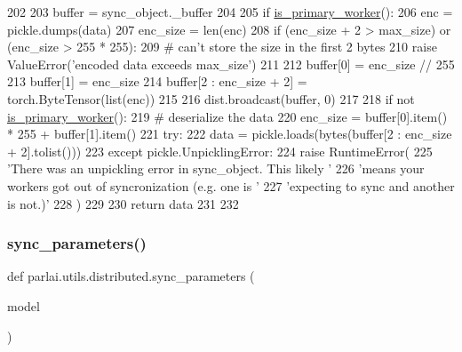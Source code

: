 \begin{DoxyCode}
202 
203     buffer = sync\_object.\_buffer
204 
205     \textcolor{keywordflow}{if} \hyperlink{namespaceparlai_1_1utils_1_1distributed_a9bb1dac198180590ef8c6b6c6f9fc2c4}{is\_primary\_worker}():
206         enc = pickle.dumps(data)
207         enc\_size = len(enc)
208         \textcolor{keywordflow}{if} (enc\_size + 2 > max\_size) \textcolor{keywordflow}{or} (enc\_size > 255 * 255):
209             \textcolor{comment}{# can't store the size in the first 2 bytes}
210             \textcolor{keywordflow}{raise} ValueError(\textcolor{stringliteral}{'encoded data exceeds max\_size'})
211 
212         buffer[0] = enc\_size // 255
213         buffer[1] = enc\_size %
214         buffer[2 : enc\_size + 2] = torch.ByteTensor(list(enc))
215 
216     dist.broadcast(buffer, 0)
217 
218     \textcolor{keywordflow}{if} \textcolor{keywordflow}{not} \hyperlink{namespaceparlai_1_1utils_1_1distributed_a9bb1dac198180590ef8c6b6c6f9fc2c4}{is\_primary\_worker}():
219         \textcolor{comment}{# deserialize the data}
220         enc\_size = buffer[0].item() * 255 + buffer[1].item()
221         \textcolor{keywordflow}{try}:
222             data = pickle.loads(bytes(buffer[2 : enc\_size + 2].tolist()))
223         \textcolor{keywordflow}{except} pickle.UnpicklingError:
224             \textcolor{keywordflow}{raise} RuntimeError(
225                 \textcolor{stringliteral}{'There was an unpickling error in sync\_object. This likely '}
226                 \textcolor{stringliteral}{'means your workers got out of syncronization (e.g. one is '}
227                 \textcolor{stringliteral}{'expecting to sync and another is not.)'}
228             )
229 
230     \textcolor{keywordflow}{return} data
231 
232 
\end{DoxyCode}
\mbox{\label{namespaceparlai_1_1utils_1_1distributed_a47e6d93d849e487d7d3f6e1a83468073}} 
\subsubsection{\texorpdfstring{sync\+\_\+parameters()}{sync\_parameters()}}
{\footnotesize\ttfamily def parlai.\+utils.\+distributed.\+sync\+\_\+parameters (\begin{DoxyParamCaption}\item[{}]{model }\end{DoxyParamCaption})}



